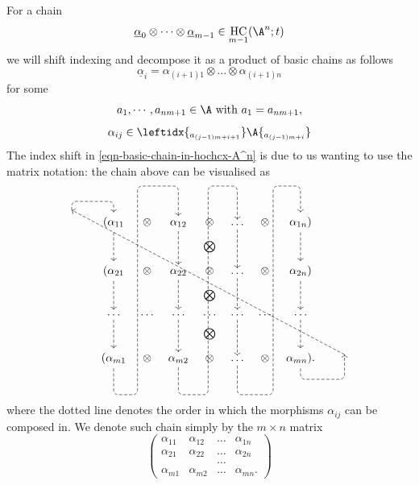 \documentclass[12pt,a4paper,reqno]{amsart}
\DeclareMathOperator{\homm}{Hom}
\DeclareMathOperator{\hochcx}{{HC}}
\begin{document}
For a chain
$$ \underline{\alpha}_0 \otimes \dots \otimes
\underline{\alpha}_{m-1} \in \hochcx_{m-1}(\A^n;t)$$ 
we will shift indexing and decompose it 
 as a product of basic chains as follows
\begin{equation}
\label{eqn-basic-chain-in-hochcx-A^n}
\underline{\alpha}_i = \alpha_{(i+1)1} \otimes \dots \otimes
\alpha_{(i+1)n} 
\end{equation}
for some
$$ a_1, \dotsm, a_{nm+1} \in \A \text{ with } a_1 = a_{nm+1},$$
$$ \alpha_{ij} \in
\leftidx{_{a_{(j-1)m+i+1}}}\A{_{a_{(j-1)m+i}}}
$$ 
The index shift in \eqref{eqn-basic-chain-in-hochcx-A^n} is
due to us wanting to use the matrix notation:
the chain above can be visualised as 
\begin{equation}
\label{eqn-m-times-n-hochschild-chain-with-the-composable-order-indicated}
\begin{tikzcd}[row sep = 0.15cm, column sep = 0.15cm]
(\alpha_{11} 
\ar[dashed]{dd}
\ar[dashed, rounded corners, to path={(-4.25,2.50)
|- ([yshift=2.25ex]\tikztostart.north) -- (\tikztostart)}]
& \otimes &
\alpha_{12}
\ar[dashed]{dd}
& \otimes &
\dots
\ar[dashed]{dd}
& \otimes &
\alpha_{1n})
\ar[dashed]{dd}
\\
& & & \bigotimes & & & 
\\
(\alpha_{21} 
\ar[dashed]{dd}
& \otimes &
\alpha_{22}
\ar[dashed]{dd}
& \otimes &
\dots
\ar[dashed]{dd}
& \otimes &
\alpha_{2n})
\ar[dashed]{dd}
\\
& & & \bigotimes & & & 
\\
\dots 
\ar[dashed]{dd}
& \dots & 
\dots 
\ar[dashed]{dd}
& \dots & 
\dots 
\ar[dashed]{dd}
& \dots & 
\dots
\ar[dashed]{dd}
\\
& & & \bigotimes & & & 
\\
(\alpha_{m1} 
\ar[dashed, rounded corners, to
path={(\tikztostart.south) |- (-2.2,-3.25) -- 
(-2.2,3.25) -| (\tikztotarget.north)}]{rruuuuuu}
& \otimes &
\alpha_{m2}
\ar[dashed, rounded corners, to
path={(\tikztostart.south) |- (0,-3.25) -- 
(0,3.25) -| (\tikztotarget.north)}]{rruuuuuu}
& \otimes &
\dots 
\ar[dashed, rounded corners, to
path={(\tikztostart.south) |- (2.025,-3.25) -- 
(2.025,3.25) -| (\tikztotarget.north)}]{rruuuuuu}
& \otimes &
\alpha_{mn}). 
\ar[dashed, rounded corners, to path={
-- ([yshift=-2.25ex]\tikztostart.south) -|
(4.25,-2.0)}]
\ar[dashed, rounded corners, to path={
(4.25,-2.0) -- (-4.25,2.50)}]
\end{tikzcd}
\end{equation}
where the dotted line denotes the order in which 
the morphisms $\alpha_{ij}$ can be composed in. 
We denote such chain simply by the $m \times n$ matrix
\begin{equation}
\begin{pmatrix}
\alpha_{11} & \alpha_{12} & \dots & \alpha_{1n}  
\\
\alpha_{21} & \alpha_{22} & \dots & \alpha_{2n}  
\\
& & \dots & 
\\
\alpha_{m1} & \alpha_{m2} & \dots & \alpha_{mn}. 
\end{pmatrix}
\end{equation}
\end{document}
